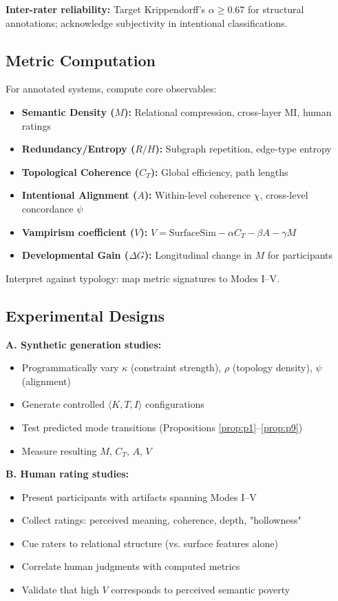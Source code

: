 \documentclass[12pt]{article}
\begin{document}
\textbf{Inter-rater reliability:} Target Krippendorff's $\alpha \geq 0.67$ \citep{krippendorff2004reliability} for structural annotations; acknowledge subjectivity in intentional classifications.

\subsection{Metric Computation}

For annotated systems, compute core observables:

\begin{itemize}
\item \textbf{Semantic Density ($M$):} Relational compression, cross-layer MI, human ratings
\item \textbf{Redundancy/Entropy ($R/H$):} Subgraph repetition, edge-type entropy
\item \textbf{Topological Coherence ($C_T$):} Global efficiency, path lengths
\item \textbf{Intentional Alignment ($A$):} Within-level coherence $\chi$, cross-level concordance $\psi$
\item \textbf{Vampirism coefficient ($V$):} $V = \text{SurfaceSim} - \alpha C_T - \beta A - \gamma M$
\item \textbf{Developmental Gain ($\Delta G$):} Longitudinal change in $M$ for participants
\end{itemize}

Interpret against typology: map metric signatures to Modes I–V.

\subsection{Experimental Designs}

\textbf{A. Synthetic generation studies:}
\begin{itemize}
\item Programmatically vary $\kappa$ (constraint strength), $\rho$ (topology density), $\psi$ (alignment)
\item Generate controlled $\langle K, T, I \rangle$ configurations
\item Test predicted mode transitions (Propositions \ref{prop:p1}–\ref{prop:p9})
\item Measure resulting $M$, $C_T$, $A$, $V$
\end{itemize}

\textbf{B. Human rating studies:}
\begin{itemize}
\item Present participants with artifacts spanning Modes I–V
\item Collect ratings: perceived meaning, coherence, depth, "hollowness"
\item Cue raters to relational structure (vs. surface features alone)
\item Correlate human judgments with computed metrics
\item Validate that high $V$ corresponds to perceived semantic poverty
\end{itemize}
\end{document}
